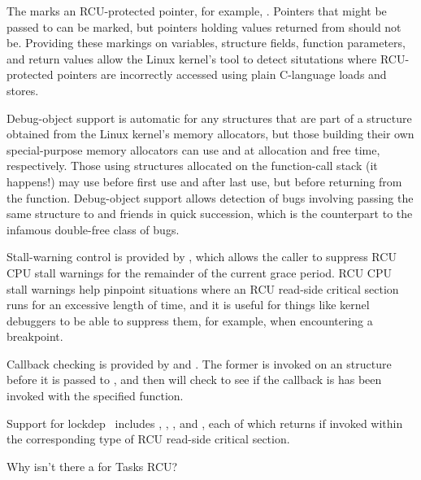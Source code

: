 The  marks an RCU-protected pointer, for example,
.
Pointers that might be passed to  can be marked,
but pointers holding values returned from 
should not be.
Providing these markings on variables, structure fields, function
parameters, and return values allow the Linux kernel's 
tool to detect situtations where RCU-protected pointers are
incorrectly accessed using plain C-language loads and stores.

Debug-object support is automatic for any  structures
that are part of a structure obtained from the Linux kernel's
memory allocators, but those building their own special-purpose
memory allocators can use  and 
at allocation and free time, respectively.
Those using  structures allocated on the function-call
stack (it happens!) may use 
before first use and  after last use,
but before returning from the function.
Debug-object support allows detection of bugs involving passing the
same  structure to  and friends in
quick succession, which is the  counterpart to the
infamous double-free class of bugs.

Stall-warning control is provided by , which
allows the caller to suppress RCU CPU stall warnings for the remainder
of the current grace period.
RCU CPU stall warnings help pinpoint situations where an RCU read-side
critical section runs for an excessive length of time, and it is useful
for things like kernel debuggers to be able to suppress them, for example,
when encountering a breakpoint.

Callback checking is provided by  and
.
The former is invoked on an  structure before it is passed
to , and then  will
check to see if the callback is has been invoked with the specified
function.

Support for lockdep~\cite{JonathanCorbet2006lockdep} includes
,
,
, and
,
each of which returns  if invoked within the corresponding
type of RCU read-side critical section.

\QuickQuiz{}
	Why isn't there a  for Tasks RCU?
 \QuickQuizEnd

